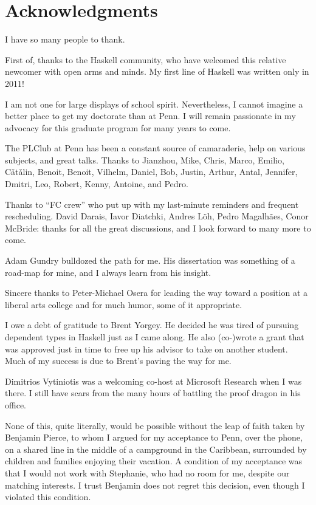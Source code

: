 \chapter*{Acknowledgments}

I have so many people to thank.

First of, thanks to the Haskell community, who have welcomed this
relative newcomer with open arms and minds. My first line of Haskell
was written only in 2011!

I am not one for large displays of school spirit. Nevertheless,
I cannot imagine a better place to get my doctorate than at Penn.
I will remain passionate in my advocacy for this graduate program
for many years to come.

The PLClub at Penn has been a constant source of camaraderie, help
on various subjects, and great talks. Thanks to Jianzhou, Mike, Chris,
Marco, Emilio, C\v{a}t\v{a}lin, Benoit, Benoit,
Vilhelm, Daniel, Bob, Justin, Arthur, Antal, Jennifer, Dmitri,
Leo, Robert, Kenny, Antoine, and Pedro.

Thanks to ``FC crew'' who put up with my last-minute reminders and
frequent rescheduling. David Darais, Iavor Diatchki,
 Andres L\"{o}h, Pedro Magalh\~{a}es, Conor McBride: thanks for all the great
discussions, and I look forward to many more to come.

Adam Gundry bulldozed the path for me. His dissertation was something of
a road-map for mine, and I always learn from his insight.

Sincere thanks to Peter-Michael Osera for leading the way toward
a position at a liberal arts college and for much humor, some of
it appropriate.

I owe a debt of gratitude to Brent Yorgey. He decided he was tired
of pursuing dependent types in Haskell just as I came along. He also
(co-)wrote a grant that was approved just in time to free up his
advisor to take on another student. Much of my success is due to
Brent's paving the way for me.

Dimitrios Vytiniotis was a welcoming co-host at Microsoft Research
when I was there. I still have scars from the many hours of battling the
proof dragon in his office.

None of this, quite literally, would be possible without the leap
of faith taken by Benjamin Pierce, to whom I argued for my acceptance
to Penn, over the phone, on a shared line in the middle of a campground
in the Caribbean, surrounded by children and families enjoying
their vacation. A condition of my acceptance was that I would not work
with Stephanie, who had no room for me, despite our matching interests.
I trust Benjamin does not regret this decision, even though I violated
this condition.

